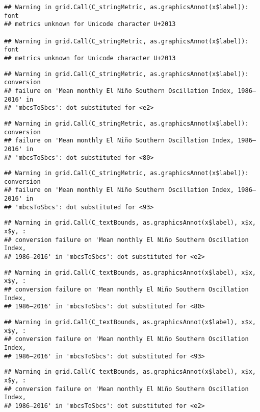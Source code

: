 \documentclass[]{article}
\theoremstyle{definition}
\theoremstyle{definition}
\theoremstyle{definition}
\theoremstyle{remark}
\begin{document}
\begin{verbatim}
## Warning in grid.Call(C_stringMetric, as.graphicsAnnot(x$label)): font
## metrics unknown for Unicode character U+2013

## Warning in grid.Call(C_stringMetric, as.graphicsAnnot(x$label)): font
## metrics unknown for Unicode character U+2013
\end{verbatim}

\begin{verbatim}
## Warning in grid.Call(C_stringMetric, as.graphicsAnnot(x$label)): conversion
## failure on 'Mean monthly El Niño Southern Oscillation Index, 1986–2016' in
## 'mbcsToSbcs': dot substituted for <e2>
\end{verbatim}

\begin{verbatim}
## Warning in grid.Call(C_stringMetric, as.graphicsAnnot(x$label)): conversion
## failure on 'Mean monthly El Niño Southern Oscillation Index, 1986–2016' in
## 'mbcsToSbcs': dot substituted for <80>
\end{verbatim}

\begin{verbatim}
## Warning in grid.Call(C_stringMetric, as.graphicsAnnot(x$label)): conversion
## failure on 'Mean monthly El Niño Southern Oscillation Index, 1986–2016' in
## 'mbcsToSbcs': dot substituted for <93>
\end{verbatim}

\begin{verbatim}
## Warning in grid.Call(C_textBounds, as.graphicsAnnot(x$label), x$x, x$y, :
## conversion failure on 'Mean monthly El Niño Southern Oscillation Index,
## 1986–2016' in 'mbcsToSbcs': dot substituted for <e2>
\end{verbatim}

\begin{verbatim}
## Warning in grid.Call(C_textBounds, as.graphicsAnnot(x$label), x$x, x$y, :
## conversion failure on 'Mean monthly El Niño Southern Oscillation Index,
## 1986–2016' in 'mbcsToSbcs': dot substituted for <80>
\end{verbatim}

\begin{verbatim}
## Warning in grid.Call(C_textBounds, as.graphicsAnnot(x$label), x$x, x$y, :
## conversion failure on 'Mean monthly El Niño Southern Oscillation Index,
## 1986–2016' in 'mbcsToSbcs': dot substituted for <93>
\end{verbatim}

\begin{verbatim}
## Warning in grid.Call(C_textBounds, as.graphicsAnnot(x$label), x$x, x$y, :
## conversion failure on 'Mean monthly El Niño Southern Oscillation Index,
## 1986–2016' in 'mbcsToSbcs': dot substituted for <e2>
\end{verbatim}
\end{document}
